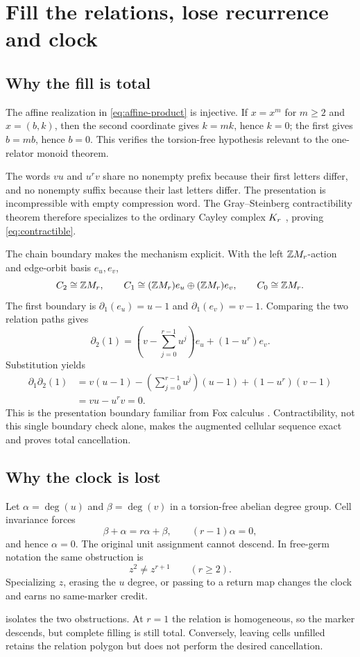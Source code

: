 \section{Fill the relations, lose recurrence and clock}
\label{sec:fill-clock}

\subsection{Why the fill is total}

The affine realization in \cref{eq:affine-product} is injective.  If
$x=x^m$ for $m\ge2$ and $x=(b,k)$, then the second coordinate gives
$k=mk$, hence $k=0$; the first gives $b=mb$, hence $b=0$.  This verifies the
torsion-free hypothesis relevant to the one-relator monoid theorem.

The words $vu$ and $u^rv$ share no nonempty prefix because their first letters
differ, and no nonempty suffix because their last letters differ.  The
presentation is incompressible with empty compression word.  The
Gray--Steinberg contractibility theorem therefore specializes to the ordinary
Cayley complex $K_r$ \citep{GraySteinberg2022}, proving
\cref{eq:contractible}.

The chain boundary makes the mechanism explicit.  With the left
$\mathbb ZM_r$-action and edge-orbit basis $e_u,e_v$,
\[
C_2\cong\mathbb ZM_r,
\qquad
C_1\cong(\mathbb ZM_r)e_u\oplus(\mathbb ZM_r)e_v,
\qquad
C_0\cong\mathbb ZM_r.
\]
The first boundary is $\partial_1(e_u)=u-1$ and
$\partial_1(e_v)=v-1$.  Comparing the two relation paths gives
\begin{equation}
\partial_2(1)=
\left(v-\sum_{j=0}^{r-1}u^j\right)e_u+(1-u^r)e_v.
\label{eq:cell-boundary}
\end{equation}
Substitution yields
\begin{align*}
\partial_1\partial_2(1)
&=v(u-1)-\left(\sum_{j=0}^{r-1}u^j\right)(u-1)
 +(1-u^r)(v-1)\\
&=vu-u^rv=0.
\end{align*}
This is the presentation boundary familiar from Fox calculus
\citep{Fox1953}.  Contractibility, not this single boundary check alone,
makes the augmented cellular sequence exact and proves total cancellation.

\subsection{Why the clock is lost}

Let $\alpha=\deg(u)$ and $\beta=\deg(v)$ in a torsion-free abelian degree
group.  Cell invariance forces
\[
\beta+\alpha=r\alpha+\beta,
\qquad
(r-1)\alpha=0,
\]
and hence $\alpha=0$.  The original unit assignment cannot descend.  In
free-germ notation the same obstruction is
\[
z^2\ne z^{r+1}\qquad(r\ge2).
\]
Specializing $z$, erasing the $u$ degree, or passing to a return map changes
the clock and earns no same-marker credit.

 isolates the two obstructions.  At $r=1$ the relation is
homogeneous, so the marker descends, but complete filling is still total.
Conversely, leaving cells unfilled retains the relation polygon but does not
perform the desired cancellation.
